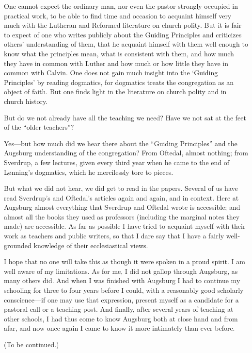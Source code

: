 One cannot expect the ordinary man, nor even the pastor strongly occupied in practical work, to be able to find time and occasion to acquaint himself very much with the Lutheran and Reformed literature on church polity. But it is fair to expect of one who writes publicly about the Guiding Principles and criticizes others’ understanding of them, that he acquaint himself with them well enough to know what the principles mean, what is consistent with them, and how much they have in common with Luther and how much or how little they have in common with Calvin. One does not gain much insight into the ‘Guiding Principles’ by reading dogmatics, for dogmatics treats the congregation as an object of faith. But one finds light in the literature on church polity and in church history.

But do we not already have all the teaching we need? Have we not sat at the feet of the “older teachers”?

Yes—but how much did we hear there about the “Guiding Principles” and the Augsburg understanding of the congregation? From Oftedal, almost nothing; from Sverdrup, a few lectures, given every third year when he came to the end of Lønning’s dogmatics, which he mercilessly tore to pieces.

But what we did not hear, we did get to read in the papers. Several of us have read Sverdrup’s and Oftedal’s articles again and again, and in context. Here at Augsburg almost everything that Sverdrup and Oftedal wrote is accessible; and almost all the books they used as professors (including the marginal notes they made) are accessible. As far as possible I have tried to acquaint myself with their work as teachers and public writers, so that I dare say that I have a fairly well-grounded knowledge of their ecclesiastical views.

I hope that no one will take this as though it were spoken in a proud spirit. I am well aware of my limitations. As for me, I did not gallop through Augsburg, as many others did. And when I was finished with Augsburg I had to continue my schooling for three to four years before I could, with a reasonably good scholarly conscience—if one may use that expression, present myself as a candidate for a pastoral call or a teaching post. And finally, after several years of teaching at other schools, I had thus come to know Augsburg both at close hand and from afar, and now once again I came to know it more intimately than ever before. 

(To be continued.)

